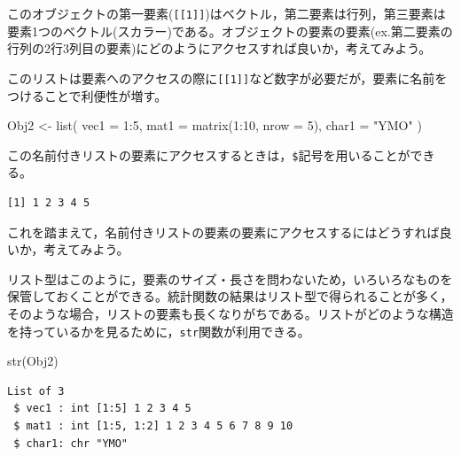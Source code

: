 \documentclass[
  a4paper,
]{ltjsbook}
\newenvironment{Shaded}{\begin{snugshade}}{\end{snugshade}}
\newcommand{\AttributeTok}[1]{\textcolor[rgb]{0.40,0.45,0.13}{#1}}
\newcommand{\DecValTok}[1]{\textcolor[rgb]{0.68,0.00,0.00}{#1}}
\newcommand{\FunctionTok}[1]{\textcolor[rgb]{0.28,0.35,0.67}{#1}}
\newcommand{\NormalTok}[1]{\textcolor[rgb]{0.00,0.23,0.31}{#1}}
\newcommand{\OtherTok}[1]{\textcolor[rgb]{0.00,0.23,0.31}{#1}}
\newcommand{\SpecialCharTok}[1]{\textcolor[rgb]{0.37,0.37,0.37}{#1}}
\newcommand{\StringTok}[1]{\textcolor[rgb]{0.13,0.47,0.30}{#1}}
\begin{document}
このオブジェクトの第一要素(\texttt{{[}{[}1{]}{]}})はベクトル，第二要素は行列，第三要素は要素1つのベクトル(スカラー)である。オブジェクトの要素の要素(ex.第二要素の行列の2行3列目の要素)にどのようにアクセスすれば良いか，考えてみよう。

このリストは要素へのアクセスの際に\texttt{{[}{[}1{]}{]}}など数字が必要だが，要素に名前をつけることで利便性が増す。

\begin{Shaded}
\begin{Highlighting}[]
\NormalTok{Obj2 }\OtherTok{\textless{}{-}} \FunctionTok{list}\NormalTok{(}
  \AttributeTok{vec1 =} \DecValTok{1}\SpecialCharTok{:}\DecValTok{5}\NormalTok{,}
  \AttributeTok{mat1 =} \FunctionTok{matrix}\NormalTok{(}\DecValTok{1}\SpecialCharTok{:}\DecValTok{10}\NormalTok{, }\AttributeTok{nrow =} \DecValTok{5}\NormalTok{),}
  \AttributeTok{char1 =} \StringTok{"YMO"}
\NormalTok{)}
\end{Highlighting}
\end{Shaded}

この名前付きリストの要素にアクセスするときは，\texttt{\$}記号を用いることができる。

\begin{Shaded}
\end{Shaded}

\begin{verbatim}
[1] 1 2 3 4 5
\end{verbatim}

これを踏まえて，名前付きリストの要素の要素にアクセスするにはどうすれば良いか，考えてみよう。

リスト型はこのように，要素のサイズ・長さを問わないため，いろいろなものを保管しておくことができる。統計関数の結果はリスト型で得られることが多く，そのような場合，リストの要素も長くなりがちである。リストがどのような構造を持っているかを見るために，\texttt{str}関数が利用できる。

\begin{Shaded}
\begin{Highlighting}[]
\FunctionTok{str}\NormalTok{(Obj2)}
\end{Highlighting}
\end{Shaded}

\begin{verbatim}
List of 3
 $ vec1 : int [1:5] 1 2 3 4 5
 $ mat1 : int [1:5, 1:2] 1 2 3 4 5 6 7 8 9 10
 $ char1: chr "YMO"
\end{verbatim}
\end{document}
